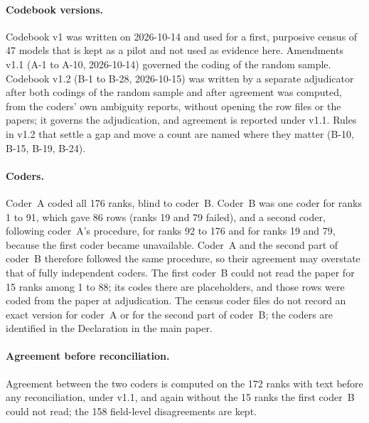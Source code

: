 \documentclass[acmsmall,screen]{acmart}
\begin{document}
\paragraph{Codebook versions.}
Codebook v1 was written on 2026-10-14 and used for a first, purposive census of 47 models that is kept as a pilot and not used as evidence here. Amendments v1.1 (A-1 to A-10, 2026-10-14) governed the coding of the random sample. Codebook v1.2 (B-1 to B-28, 2026-10-15) was written by a separate adjudicator after both codings of the random sample and after agreement was computed, from the coders' own ambiguity reports, without opening the row files or the papers; it governs the adjudication, and agreement is reported under v1.1. %
Rules in v1.2 that settle a gap and move a count are named where they matter (B-10, B-15, B-19, B-24). %

\paragraph{Coders.}
Coder~A coded all 176 ranks, blind to coder~B. Coder~B was one coder for ranks 1 to 91, which gave 86 rows (ranks 19 and 79 failed), and a second coder, following coder~A's procedure, for ranks 92 to 176 and for ranks 19 and 79, because the first coder became unavailable. Coder~A and the second part of coder~B therefore followed the same procedure, so their agreement may overstate that of fully independent coders. %
The first coder~B could not read the paper for 15 ranks among 1 to 88; its codes there are placeholders, and those rows were coded from the paper at adjudication. %
The census coder files do not record an exact version for coder~A or for the second part of coder~B; the coders are identified in the Declaration in the main paper.

\paragraph{Agreement before reconciliation.}
Agreement between the two coders is computed on the 172 ranks with text before any reconciliation, under v1.1, and again without the 15 ranks the first coder~B could not read; the 158 field-level disagreements are kept. %
\end{document}
